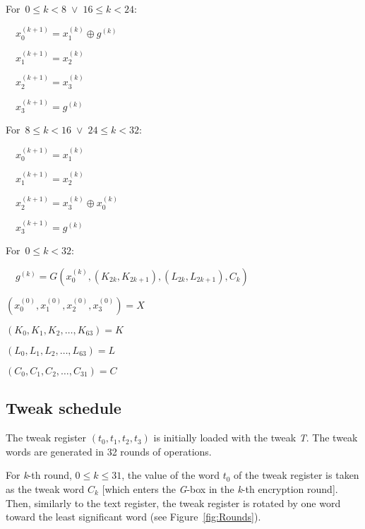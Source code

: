 \documentclass[a4paper,oneside,english]{amsart}
\numberwithin{equation}{section}
\numberwithin{figure}{section}
\newenvironment{lyxcode}
{\par\begin{list}{}{
\setlength{\rightmargin}{\leftmargin}
\setlength{\listparindent}{0pt}\raggedright
\setlength{\itemsep}{0pt}
\setlength{\parsep}{0pt}
\normalfont\ttfamily}\item[]}
{\end{list}}
\begin{document}
\begin{algorithm}
\begin{lyxcode}
For~$0\leqslant k<8\;\vee\;16\leqslant k<24$:

~~$x_{0}^{(k+1)}=x_{1}^{(k)}\oplus g^{(k)}$

~~$x_{1}^{(k+1)}=x_{2}^{(k)}$

~~$x_{2}^{(k+1)}=x_{3}^{(k)}$

~~$x_{3}^{(k+1)}=g^{(k)}$

For~$8\leqslant k<16\;\vee\;24\leqslant k<32$:

~~$x_{0}^{(k+1)}=x_{1}^{(k)}$

~~$x_{1}^{(k+1)}=x_{2}^{(k)}$

~~$x_{2}^{(k+1)}=x_{3}^{(k)}\oplus x_{0}^{(k)}$

~~$x_{3}^{(k+1)}=g^{(k)}$~

For~$0\leqslant k<32$:

~~$g^{(k)}=G(x_{0}^{(k)},(K_{2k},K_{2k+1}),(L_{2k},L_{2k+1}),C_{k})$~

$(x_{0}^{(0)},x_{1}^{(0)},x_{2}^{(0)},x_{3}^{(0)})=X$

$(K_{0},K_{1},K_{2},\ldots,K_{63})=K$

$(L_{0},L_{1},L_{2},\ldots,L_{63})=L$

$(C_{0},C_{1},C_{2},\ldots,C_{31})=C$\end{lyxcode}
\end{algorithm}
 


\subsection{Tweak schedule}

The tweak register $(t_{0},t_{1},t_{2},t_{3})$ is initially loaded
with the tweak \emph{T}. The tweak words are generated in 32 rounds
of operations.

For \emph{k}-th round, $0\leq k\leq31$, the value of the word $t_{0}$
of the tweak register is taken as the tweak word $C_{k}$ {[}which
enters the \emph{G}-box in the \emph{k}-th encryption round{]}. Then,
similarly to the text register, the tweak register is rotated by one
word toward the least significant word (see Figure~\ref{fig:Rounds}).
\end{document}
